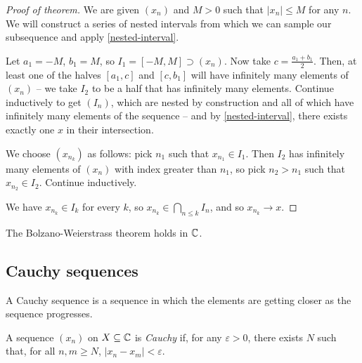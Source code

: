 \documentclass{../../template/note}
\begin{document}
    \begin{proof}[Proof of theorem]
        We are given \((x_n)\) and \(M > 0\) such that \(|x_n| \leq M\) for any \(n\). We will construct a series of nested intervals from which we can sample our subsequence and apply \cref{nested-interval}.

        Let \(a_1 = -M\), \(b_1 = M\), so \(I_1 = [-M, M] \supset (x_n)\). Now take \(c = \frac{a_1+b_1}{2}\). Then, at least one of the halves \([a_1, c]\) and \([c, b_1]\) will have infinitely many elements of \((x_n)\) -- we take \(I_2\) to be a half that has infinitely many elements. Continue inductively to get \((I_n)\), which are nested by construction and all of which have infinitely many elements of the sequence -- and by \cref{nested-interval}, there exists exactly one \(x\) in their intersection.
        
        We choose \((x_{n_k})\) as follows: pick \(n_1\) such that \(x_{n_1} \in I_1\). Then \(I_2\) has infinitely many elements of \((x_n)\) with index greater than \(n_1\), so pick \(n_2 > n_1\) such that \(x_{n_2} \in I_2\). Continue inductively.

        We have \(x_{n_k} \in I_k\) for every \(k\), so \(x_{n_k} \in \bigcap_{n \leq k} I_n\), and so \(x_{n_k} \to x\).
    \end{proof}

    \begin{corollary}
        The Bolzano-Weierstrass theorem holds in \(\mathbb C\).
    \end{corollary}
    
    
    
    \subsection{Cauchy sequences}

    A Cauchy sequence is a sequence in which the elements are getting closer as the sequence progresses.

    \begin{definition}
        A sequence \((x_n)\) on \(X \subseteq \mathbb C\) is \emph{Cauchy} if, for any \(\varepsilon > 0\), there exists \(N\) such that, for all \(n, m \geq N\), \(|x_n - x_m| < \varepsilon\).
    \end{definition}
    
\end{document}
